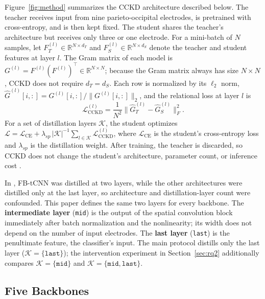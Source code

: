 \documentclass[11pt,a4paper,twoside,asymmetric]{article}
\begin{document}
Figure~\ref{fig:method} summarizes the CCKD architecture described below. The teacher receives input from nine parieto-occipital electrodes, is pretrained with cross-entropy, and is then kept fixed. The student shares the teacher's architecture but receives only three or one electrode. For a mini-batch of $N$ samples, let $F_T^{(l)} \in \mathbb{R}^{N \times d_T}$ and $F_S^{(l)} \in \mathbb{R}^{N \times d_S}$ denote the teacher and student features at layer $l$. The Gram matrix of each model is $G^{(l)} = F^{(l)} (F^{(l)})^{\top} \in \mathbb{R}^{N \times N}$; because the Gram matrix always has size $N \times N$, CCKD does not require $d_T = d_S$. Each row is normalized by its $\ell_2$ norm, $\hat{G}^{(l)}[i,:] = G^{(l)}[i,:] / \lVert G^{(l)}[i,:] \rVert_2$, and the relational loss at layer $l$ is
\begin{equation}
\mathcal{L}_{\text{CCKD}}^{(l)} = \frac{1}{N^2} \bigl\lVert \hat{G}_{T}^{(l)} - \hat{G}_{S}^{(l)} \bigr\rVert_F^2 .
\label{eq:relloss}
\end{equation}
For a set of distillation layers $\mathcal{K}$, the student optimizes $\mathcal{L} = \mathcal{L}_{\text{CE}} + \lambda_{sp} \, |\mathcal{K}|^{-1} \sum_{l \in \mathcal{K}} \mathcal{L}_{\text{CCKD}}^{(l)}$, where $\mathcal{L}_{\text{CE}}$ is the student's cross-entropy loss and $\lambda_{sp}$ is the distillation weight. After training, the teacher is discarded, so CCKD does not change the student's architecture, parameter count, or inference cost \cite{R82}.

In \cite{R82}, FB-tCNN was distilled at two layers, while the other architectures were distilled only at the last layer, so architecture and distillation-layer count were confounded. This paper defines the same two layers for every backbone. The \textbf{intermediate layer} (\texttt{mid}) is the output of the spatial convolution block immediately after batch normalization and the nonlinearity; its width does not depend on the number of input electrodes. The \textbf{last layer} (\texttt{last}) is the penultimate feature, the classifier's input. The main protocol distills only the last layer ($\mathcal{K}=\{\texttt{last}\}$); the intervention experiment in Section~\ref{sec:rq2} additionally compares $\mathcal{K}=\{\texttt{mid}\}$ and $\mathcal{K}=\{\texttt{mid},\texttt{last}\}$.

\subsection{Five Backbones}
\label{sec:backbones}
\end{document}
